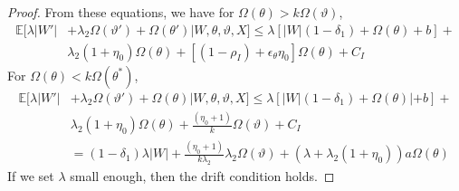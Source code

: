 \begin{proof}
From these equations, we have for $\Omega(\theta) > k \Omega(\vartheta)$,
\begin{align*}
  \mathbb{E}[\lambda |W'| &+ \lambda_2 \Omega(\vartheta') + \Omega(\theta')| 
  W, \theta, \vartheta, X] \leq 
  \lambda \left[|W|(1 - \delta_1) +  \Omega(\theta) + b\right] + \\
  & \lambda_2 (1+\eta_0)\Omega(\theta) +
  \left[(1-\rho_I)  +\epsilon_\theta \eta_0 \right] \Omega(\theta) + C_I 
\end{align*}
For $\Omega(\theta) < k \Omega(\theta^*)$,
\begin{align*}
  \mathbb{E}[\lambda |W'| &+ \lambda_2 \Omega(\vartheta') +
  \Omega(\theta)| W, \theta, \vartheta, X] \leq 
  \lambda \left[|W|(1 - \delta_1) +  \Omega(\theta)| + b\right] + \\
& \lambda_2(1+\eta_0) \Omega(\theta) +
    \frac{(\eta_0 + 1)}{k} \Omega(\vartheta) + C_I \\
    &= (1-\delta_1)\lambda|W| + \frac{(\eta_0 + 1)}{k\lambda_2} \lambda_2\Omega(\vartheta)+
    (\lambda + \lambda_2(1+\eta_0))a\Omega(\theta)
\end{align*}
If we set  $\lambda$ small enough, then the drift condition holds.
\end{proof}
